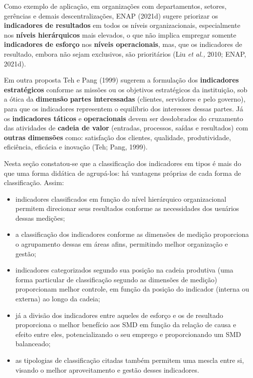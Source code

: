 \documentclass[
  letterpaper,
  DIV=11,
  numbers=noendperiod]{scrreprt}
\begin{document}
Como exemplo de aplicação, em organizações com departamentos, setores,
gerências e demais descentralizações, ENAP (2021d) sugere priorizar os
\textbf{indicadores de resultados} em todos os níveis organizacionais,
especialmente nos \textbf{níveis hierárquicos} mais elevados, o que não
implica empregar somente \textbf{indicadores de esforço} nos
\textbf{níveis operacionais}, mas, que os indicadores de resultado,
embora não sejam exclusivos, são prioritários (Liu \emph{et al.,} 2010;
ENAP, 2021d).

Em outra proposta Teh e Pang (1999) sugerem a formulação dos
\textbf{indicadores estratégicos} conforme as missões ou os objetivos
estratégicos da instituição, sob a ótica da \textbf{dimensão}
\textbf{partes interessadas} (clientes, servidores e pelo governo), para
que os indicadores representem o equilíbrio dos interesses dessas
partes. Já os \textbf{indicadores táticos} e \textbf{operacionais} devem
ser desdobrados do cruzamento das atividades de \textbf{cadeia de valor}
(entradas, processos, saídas e resultados) com \textbf{outras dimensões}
como: satisfação dos clientes, qualidade, produtividade, eficiência,
eficácia e inovação (Teh; Pang, 1999).

Nesta seção constatou-se que a classificação dos indicadores em tipos é
mais do que uma forma didática de agrupá-los: há vantagens próprias de
cada forma de classificação. Assim:

\begin{itemize}
\item
  indicadores classificados em função do nível hierárquico
  organizacional permitem direcionar seus resultados conforme as
  necessidades dos usuários dessas medições;
\item
  a classificação dos indicadores conforme as dimensões de medição
  proporciona o agrupamento dessas em áreas afins, permitindo melhor
  organização e gestão;
\item
  indicadores categorizados segundo sua posição na cadeia produtiva (uma
  forma particular de classificação segundo as dimensões de medição)
  proporcionam melhor controle, em função da posição do indicador
  (interna ou externa) ao longo da cadeia;
\item
  já a divisão dos indicadores entre aqueles de esforço e os de
  resultado proporciona o melhor benefício aos SMD em função da relação
  de causa e efeito entre eles, potencializando o seu emprego e
  proporcionando um SMD balanceado;
\item
  as tipologias de classificação citadas também permitem uma mescla
  entre si, visando o melhor aproveitamento e gestão desses indicadores.
\end{itemize}
\end{document}
